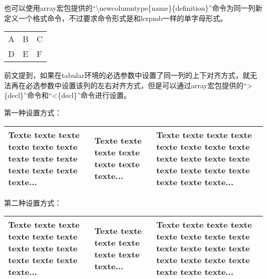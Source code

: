 ﻿\documentclass{article}
\begin{document}
    \mbox{}

    也可以使用array宏包提供的``\textbackslash newcolumntype\{name\}\{definition\}''命令为同一列新定义一个格式命令，不过要求命令形式是和lcrpmb一样的单字母形式。

    \mbox{}

    \begin{tabular}{|N|l|l|}
        A&B&C\\
        D&E&F\\
    \end{tabular}

    \mbox{}

    前文提到，如果在tabular环境的必选参数中设置了同一列的上下对齐方式，就无法再在必选参数中设置该列的左右对齐方式，但是可以通过array宏包提供的``>\{decl\}''命令和``<\{decl\}''命令进行设置。

    第一种设置方式：

    \mbox{}

    \begin{tabular}{b{8em}|
        >{\centering}b{8em}|
        >{\raggedleft\arraybackslash}b{8em}|}
        \hline
        Texte texte texte texte texte texte texte
        texte texte texte texte texte texte...&
        Texte texte texte texte texte texte texte...&
        Texte texte texte texte texte texte texte
        texte texte texte texte texte texte
        texte texte texte texte texte texte...\\
        \hline
    \end{tabular}

    \mbox{}

    第二种设置方式：

    \mbox{}

    \begin{tabular}{b{8em}|
        >{\centering}b{8em}|
        >{\raggedleft}b{8em}|}
        \hline
        Texte texte texte texte texte texte texte
        texte texte texte texte texte texte...&
        Texte texte texte texte texte texte texte...&
        Texte texte texte texte texte texte texte
        texte texte texte texte texte texte
        texte texte texte texte texte texte...\tabularnewline
        \hline
    \end{tabular}
\end{document}
